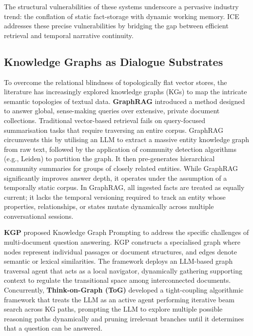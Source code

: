 \documentclass[11pt,a4paper]{article}
\begin{document}
The structural vulnerabilities of these systems underscore a pervasive industry trend: the conflation of static fact-storage with dynamic working memory. ICE addresses these precise vulnerabilities by bridging the gap between efficient retrieval and temporal narrative continuity.

\subsection{Knowledge Graphs as Dialogue Substrates}

To overcome the relational blindness of topologically flat vector stores, the literature has increasingly explored knowledge graphs (KGs) to map the intricate semantic topologies of textual data. \textbf{GraphRAG} \citep{edge2024graphrag} introduced a method designed to answer global, sense-making queries over extensive, private document collections. Traditional vector-based retrieval fails on query-focused summarisation tasks that require traversing an entire corpus. GraphRAG circumvents this by utilising an LLM to extract a massive entity knowledge graph from raw text, followed by the application of community detection algorithms (e.g., Leiden) to partition the graph. It then pre-generates hierarchical community summaries for groups of closely related entities. While GraphRAG significantly improves answer depth, it operates under the assumption of a temporally static corpus. In GraphRAG, all ingested facts are treated as equally current; it lacks the temporal versioning required to track an entity whose properties, relationships, or states mutate dynamically across multiple conversational sessions.

\textbf{KGP} \citep{wang2023kgp} proposed Knowledge Graph Prompting to address the specific challenges of multi-document question answering. KGP constructs a specialised graph where nodes represent individual passages or document structures, and edges denote semantic or lexical similarities. The framework deploys an LLM-based graph traversal agent that acts as a local navigator, dynamically gathering supporting context to regulate the transitional space among interconnected documents. Concurrently, \textbf{Think-on-Graph (ToG)} \citep{sun2024tog} developed a tight-coupling algorithmic framework that treats the LLM as an active agent performing iterative beam search across KG paths, prompting the LLM to explore multiple possible reasoning paths dynamically and pruning irrelevant branches until it determines that a question can be answered.
\end{document}
